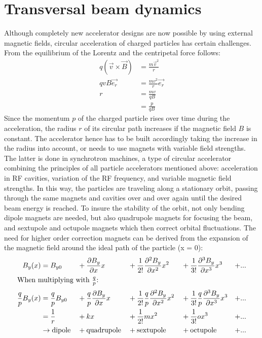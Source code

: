 \section{Transversal beam dynamics}
\label{AccPhysics:Magnets}

Although completely new accelerator designs are now possible by using external magnetic fields, circular acceleration of charged particles has certain challenges.
From the equilibrium of the Lorentz and the centripetal force follows:
\begin{align}
q(\vec{v}\times \vec{B}) &= \frac{m\vec{v}^2}{r}\\
qvB\vec{e_r} &= \frac{mv^2}{r}\vec{e_r} \nonumber \\
 r&=\frac{mv}{qB}\\
 &=\frac{p}{qB}\label{eq:MagField_Radius}
\end{align}
Since the momentum $p$ of the charged particle rises over time during the acceleration, the radius $r$ of its circular path increases if the magnetic field $B$ is constant.
The accelerator hence has to be built accordingly taking the increase in the radius into account, or needs to use magnets with variable field strengths.
The latter is done in synchrotron machines, a type of circular accelerator combining the principles of all particle accelerators mentioned above: acceleration in RF cavities, variation of the RF frequency, and variable magnetic field strengths.
In this way, the particles are traveling along a stationary orbit, passing through the same magnets and cavities over and over again until the desired beam energy is reached.
To insure the stability of the orbit, not only bending dipole magnets are needed, but also quadrupole magnets for focusing the beam, and sextupole and octupole magnets which then correct orbital fluctuations.
The need for higher order correction magnets can be derived from the expansion of the magnetic field around the ideal path of the particle (x = 0):
\begin{alignat}{5}
 B_y(x) &= B_{y0} &&+ \frac{\partial B_y}{\partial x}x &&+ \frac{1}{2!}\frac{\partial^2 B_y}{\partial x^2}x^2 &&+ \frac{1}{3!}\frac{\partial^3 B_y}{\partial x^3}x^3 &+ ...\\
 \intertext{When multiplying with $\frac{q}{p}$:}
 \frac{q}{p}B_y(x) &= \frac{q}{p}B_{y0} &&+ \frac{q}{p}\frac{\partial B_y}{\partial x}x &&+  \frac{1}{2!}\frac{q}{p}\frac{\partial^2 B_y}{\partial x^2}x^2 &&+ \frac{1}{3!}\frac{q}{p}\frac{\partial^3 B_y}{\partial x^3}x^3 &+ ...\\
  &= \frac{1}{r} &&+ kx &&+ \frac{1}{2!}mx^2 &&+ \frac{1}{3!}ox^3 &+ ... \label{eq:field_components}\\
  &\rightarrow \textnormal{dipole} &&+ \textnormal{quadrupole} &&+ \textnormal{sextupole} &&+ \textnormal{octupole} &+ ...\nonumber
\end{alignat}

